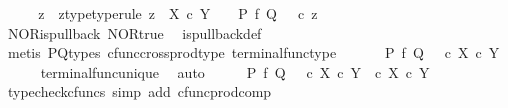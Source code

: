 \begin{isabellebody}
%
\isadelimproof
%
\endisadelimproof
%
\isatagproof
{}\isamarkupfalse%
\ {\isacharminus}{\kern0pt}\isanewline
\ \ \isamarkupfalse%
\ z\ \ z{\isacharunderscore}{\kern0pt}type{\isacharbrackleft}{\kern0pt}type{\isacharunderscore}{\kern0pt}rule{\isacharbrackright}{\kern0pt}{\isacharcolon}{\kern0pt}\ {\isachardoublequoteopen}z\ {\isacharcolon}{\kern0pt}\ X\ {\isasymtimes}\isactrlsub c\ Y\ {\isasymrightarrow}\ {\isasymone}{\isachardoublequoteclose}\ \ {\isachardoublequoteopen}P\ {\isasymtimes}\isactrlsub f\ Q\ {\isacharequal}{\kern0pt}\ {\isasymlangle}{\isasymf}{\isacharcomma}{\kern0pt}{\isasymf}{\isasymrangle}\ {\isasymcirc}\isactrlsub c\ z{\isachardoublequoteclose}\isanewline
\ \ \ \ \isamarkupfalse%
\ NOR{\isacharunderscore}{\kern0pt}is{\isacharunderscore}{\kern0pt}pullback\ NOR{\isacharunderscore}{\kern0pt}true\ \isamarkupfalse%
\ is{\isacharunderscore}{\kern0pt}pullback{\isacharunderscore}{\kern0pt}def\isanewline
\ \ \ \ \isamarkupfalse%
\ {\isacharparenleft}{\kern0pt}metis\ P{\isacharunderscore}{\kern0pt}Q{\isacharunderscore}{\kern0pt}types\ cfunc{\isacharunderscore}{\kern0pt}cross{\isacharunderscore}{\kern0pt}prod{\isacharunderscore}{\kern0pt}type\ terminal{\isacharunderscore}{\kern0pt}func{\isacharunderscore}{\kern0pt}type{\isacharparenright}{\kern0pt}\ \isanewline
\ \ \isamarkupfalse%
\ \isamarkupfalse%
\ {\isachardoublequoteopen}P\ {\isasymtimes}\isactrlsub f\ Q\ {\isacharequal}{\kern0pt}\ {\isasymlangle}{\isasymf}{\isacharcomma}{\kern0pt}{\isasymf}{\isasymrangle}\ {\isasymcirc}\isactrlsub c\ {\isasymbeta}\isactrlbsub X\ {\isasymtimes}\isactrlsub c\ Y\isactrlesub {\isachardoublequoteclose}\isanewline
\ \ \ \ \isamarkupfalse%
\ terminal{\isacharunderscore}{\kern0pt}func{\isacharunderscore}{\kern0pt}unique\ \isamarkupfalse%
\ auto\isanewline
\ \ \isamarkupfalse%
\ \isamarkupfalse%
\ {\isachardoublequoteopen}P\ {\isasymtimes}\isactrlsub f\ Q\ {\isacharequal}{\kern0pt}\ {\isasymlangle}{\isasymf}\ {\isasymcirc}\isactrlsub c\ {\isasymbeta}\isactrlbsub X\ {\isasymtimes}\isactrlsub c\ Y\isactrlesub {\isacharcomma}{\kern0pt}\ {\isasymf}\ {\isasymcirc}\isactrlsub c\ {\isasymbeta}\isactrlbsub X\ {\isasymtimes}\isactrlsub c\ Y\isactrlesub {\isasymrangle}{\isachardoublequoteclose}\isanewline
\ \ \ \ \isamarkupfalse%
\ {\isacharparenleft}{\kern0pt}typecheck{\isacharunderscore}{\kern0pt}cfuncs{\isacharcomma}{\kern0pt}\ simp\ add{\isacharcolon}{\kern0pt}\ cfunc{\isacharunderscore}{\kern0pt}prod{\isacharunderscore}{\kern0pt}comp{\isacharparenright}{\kern0pt}\isanewline

\end{isabellebody}
